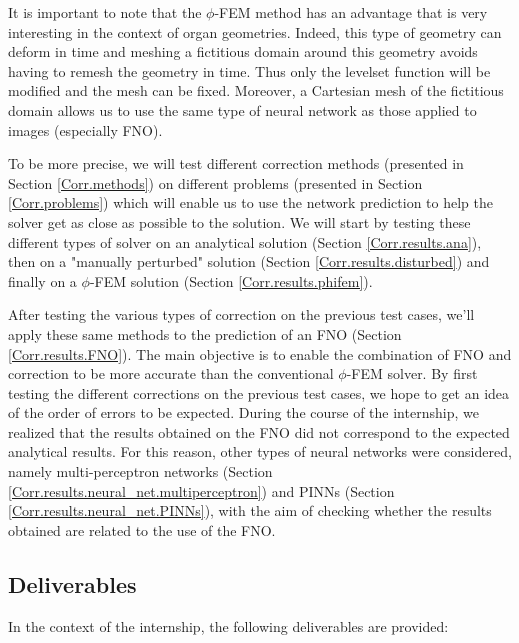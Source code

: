 It is important to note that the $\phi$-FEM method has an advantage that is very interesting in the context of organ geometries. Indeed, this type of geometry can deform in time and meshing a fictitious domain around this geometry avoids having to remesh the geometry in time. Thus only the levelset function will be modified and the mesh can be fixed. Moreover, a Cartesian mesh of the fictitious domain allows us to use the same type of neural network as those applied to images (especially FNO).

To be more precise, we will test different correction methods (presented in Section \ref{Corr.methods}) on different problems (presented in Section \ref{Corr.problems}) which will enable us to use the network prediction to help the solver get as close as possible to the solution. We will start by testing these different types of solver on an analytical solution (Section \ref{Corr.results.ana}), then on a "manually perturbed" solution (Section \ref{Corr.results.disturbed}) and finally on a $\phi$-FEM solution (Section \ref{Corr.results.phifem}).

After testing the various types of correction on the previous test cases, we'll apply these same methods to the prediction of an FNO (Section \ref{Corr.results.FNO}). The main objective is to enable the combination of FNO and correction to be more accurate than the conventional $\phi$-FEM solver. By first testing the different corrections on the previous test cases, we hope to get an idea of the order of errors to be expected. During the course of the internship, we realized that the results obtained on the FNO did not correspond to the expected analytical results. For this reason, other types of neural networks were considered, namely multi-perceptron networks (Section \ref{Corr.results.neural_net.multiperceptron}) and PINNs (Section \ref{Corr.results.neural_net.PINNs}), with the aim of checking whether the results obtained are related to the use of the FNO.

\subsection{Deliverables}

In the context of the internship, the following deliverables are provided:

